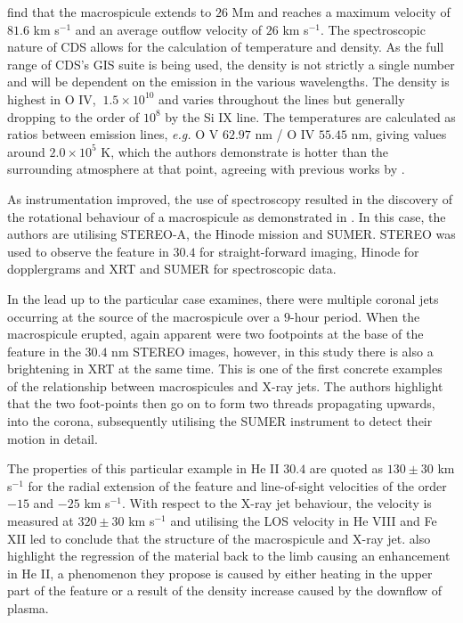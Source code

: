 \cite{Parenti2002} find that the macrospicule extends to $26$ Mm and reaches a maximum velocity of $81.6$ km s${^{-1}}$ and an average outflow velocity of $26$ km s${^{-1}}$.
The spectroscopic nature of CDS allows for the calculation of temperature and density.
As the full range of CDS's GIS suite is being used, the density is not strictly a single number and will be dependent on the emission in the various wavelengths.
The density is highest in O IV, $~1.5 \times 10^{10}$ and varies throughout the lines but generally dropping to the order of $10^8$ by the Si IX line.
The temperatures are calculated as ratios between emission lines, \emph{e.g.} O V $62.97$ nm / O IV $55.45$ nm, giving values around $2.0 \times 10^5$ K, which the authors demonstrate is hotter than the surrounding atmosphere at that point, agreeing with previous works by \cite{Habbal1991}.


As instrumentation improved, the use of spectroscopy resulted in the discovery of the rotational behaviour of a macrospicule as demonstrated in \cite{Kamio2010}.
In this case, the authors are utilising STEREO-A, the Hinode mission and SUMER. 
STEREO was used to observe the feature in $30.4$ for straight-forward imaging, Hinode for dopplergrams and XRT and SUMER for spectroscopic data.

In the lead up to the particular case \cite{Kamio2010} examines, there were multiple coronal jets occurring at the source of the macrospicule over a $9$-hour period.
When the macrospicule erupted, again apparent were two footpoints at the base of the feature in the $30.4$ nm STEREO images, however, in this study there is also a brightening in XRT at the same time. 
This is one of the first concrete examples of the relationship between macrospicules and X-ray jets.
The authors highlight that the two foot-points then go on to form two threads propagating upwards, into the corona, subsequently utilising the SUMER instrument to detect their motion in detail.

The properties of this particular example in He II $30.4$ are quoted as $130 \pm 30$ km s${^{-1}}$ for the radial extension of the feature and line-of-sight velocities of the order $-15$ and $-25$ km s${^{-1}}$.
With respect to the X-ray jet behaviour, the velocity is measured at $320 \pm 30$ km s${^{-1}}$ and utilising the LOS velocity in He VIII and Fe XII led \cite{Kamio2010} to conclude that the structure of the macrospicule and X-ray jet.
\cite{Kamio2010} also highlight the regression of the material back to the limb causing an enhancement in He II, a phenomenon they propose is caused by either heating in the upper part of the feature or a result of the density increase caused by the downflow of plasma.

